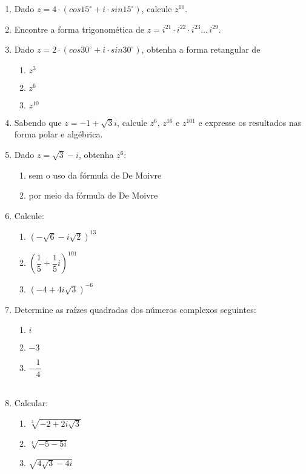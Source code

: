 \documentclass[a4paper, 11pt]{article}
\begin{document}
\begin{enumerate}
\item Dado $z = 4\cdot(cos15^{\circ} + i\cdot sin15^{\circ})$, calcule $z^{10}$.

\item Encontre a forma trigonomética de $z = i^{21}\cdot i^{22}\cdot i^{23} \ldots \, i^{29}$. 

\item Dado $z = 2\cdot(cos30^{\circ} + i\cdot sin30^{\circ})$, obtenha a forma retangular de
	\begin{enumerate}
	\item $z^3$
	\item $z^6$
	\item $z^{10}$
	\end{enumerate}
	
\item Sabendo que $z = -1 + \sqrt{3}i$, calcule $z^{6}$, $z^{16}$ e $z^{101}$ e expresse os resultados nas forma polar e algébrica.


\item Dado $z = \sqrt{3} - i$, obtenha $z^6$:
	\begin{enumerate}
	\item sem o uso da fórmula de De Moivre
	\item por meio da fórmula de De Moivre
	\end{enumerate}

\item Calcule:
	\begin{enumerate}
	\item $(-\sqrt{6} -i\sqrt{2})^{13}$
	\item $(\dfrac{1}{5} + \dfrac{1}{5}i)^{101}$
	\item $(-4 + 4i\sqrt{3})^{-6}$
	\end{enumerate}

\item Determine as raízes quadradas dos números complexos seguintes:
	\begin{enumerate}
	\item $i$
	\item $-3$
	\item $-\dfrac{1}{4}$
	\\
	\\
	\end{enumerate}

\item Calcular:
	\begin{enumerate}
	\item $\sqrt[3]{-2+2i\sqrt{3}}$
	\item $\sqrt[4]{-5 -5i}$
	\item $\sqrt{4\sqrt{3} - 4i}$
	\end{enumerate}


\end{enumerate}
\end{document}
